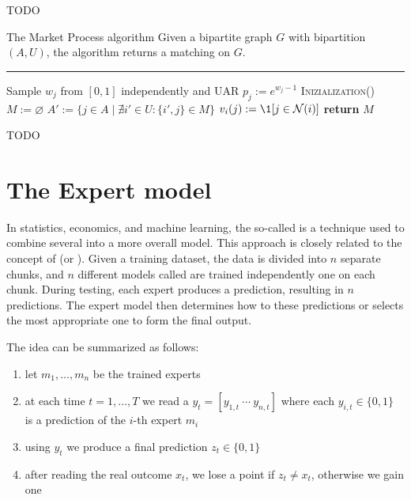 \documentclass[a4paper, 12pt]{report}
\begin{document}
    TODO 

    \begin{framedalgo}{The Market Process algorithm}
        Given a bipartite graph $G$ with bipartition $(A, U)$, the algorithm returns a matching on $G$. \\
        \hrule

        \quad
        \begin{algorithmic}[1]
                    \State Sample $w_j$ from $[0,1]$ independently and UAR
                    \State $p_j := e^{w_j - 1}$ 
                \EndFor
            \EndFunction
                \State \textsc{Inizialization}()
                \State $M := \varnothing$
                        \State $A' := \{j \in A \mid \nexists i' \in U : \{i', j \} \in M\}$ 
                            \State $v_i(j) := \1[j \in \mathcal N(i)]$ 
                        \EndFor
                    \EndFor
                \State \textbf{return} $M$
            \EndFunction
        \end{algorithmic}
    \end{framedalgo}

    TODO 

    \section{The Expert model}

    In statistics, economics, and machine learning, the so-called  is a technique used to combine several  into a more  overall model. This approach is closely related to the concept of  (or ). Given a training dataset, the data is divided into $n$ separate chunks, and $n$ different models called  are trained independently one on each chunk. During testing, each expert produces a prediction, resulting in $n$ predictions. The expert model then determines how to  these predictions or selects the most appropriate one to form the final output.

    The idea can be summarized as follows:

    \begin{enumerate}
        \item let $m_1, \ldots, m_n$ be the trained experts
        \item at each time $t = 1, \ldots, T$ we read a  $y_t = [y_{1, t} \ \cdots \ y_{n, t}]$ where each $y_{i, t} \in \{0, 1\}$ is a prediction of the $i$-th expert $m_i$
        \item using $y_t$ we produce a final prediction $z_t \in \{0, 1\}$
        \item after reading the real outcome $x_t$, we lose a point if $z_t \neq x_t$, otherwise we gain one
    \end{enumerate}
\end{document}

